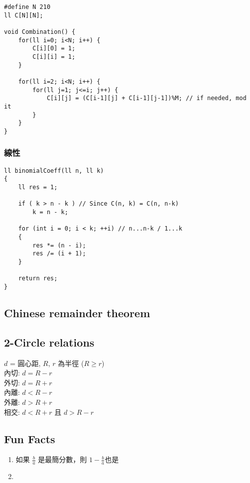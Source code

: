 \documentclass[10pt,oneside]{article}
\begin{document}
\begin{landscape}
\begin{multicols}{2}
\begin{lstlisting}
#define N 210
ll C[N][N];

void Combination() {
    for(ll i=0; i<N; i++) {
        C[i][0] = 1;
        C[i][i] = 1;
    }

    for(ll i=2; i<N; i++) {
        for(ll j=1; j<=i; j++) {
            C[i][j] = (C[i-1][j] + C[i-1][j-1])%M; // if needed, mod it
        }
    }
}
\end{lstlisting}

\subsubsection{線性}

\begin{lstlisting}
ll binomialCoeff(ll n, ll k)
{
    ll res = 1;
 
    if ( k > n - k ) // Since C(n, k) = C(n, n-k)
        k = n - k;
 
    for (int i = 0; i < k; ++i) // n...n-k / 1...k
    {
        res *= (n - i);
        res /= (i + 1);
    }
 
    return res;
}
\end{lstlisting}

\subsection{Chinese remainder theorem}


\subsection{2-Circle relations}

$d$ = 圓心距, $R$, $r$ 為半徑 ($R \geq r$)\\
內切: $d = R - r$\\
外切: $d = R + r$\\
內離: $d < R - r$\\
外離: $d > R + r$\\
相交: $d < R + r$ 且 $d > R - r$

\subsection{Fun Facts}

\begin{enumerate}
	\item 如果 $\frac b a$ 是最簡分數，則 $1 - \frac b a$也是%
	\item 
\end{enumerate}


\end{multicols}
\end{landscape}
\end{document}
